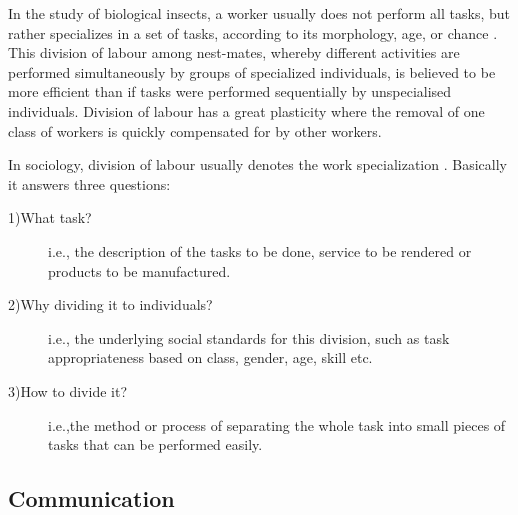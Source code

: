 In the study of biological insects, a worker usually does not perform all tasks, but rather specializes in a set of tasks, according to its morphology, age, or chance \cite{Bonabeau+1999}. This division of labour among nest-mates, whereby different activities are performed simultaneously by groups of specialized individuals, is believed to be more efficient than if tasks were performed sequentially by unspecialised individuals. Division of  labour has a great plasticity where the removal of one class of workers is quickly compensated for by other workers.

In sociology, division of labour usually denotes the work specialization \cite{Sayer+1992}. Basically it answers three questions:
\begin{description}
\item[1)What task?] i.e., the description of the tasks to be done, service to be rendered or products to be manufactured.
\item[2)Why dividing it to individuals?] i.e., the underlying social standards for this division, such as task appropriateness based on class, gender, age, skill etc.
\item[3)How to divide it?] i.e.,the method or process of separating the whole task into small pieces of tasks that can be performed easily. 
\end{description}
\subsection{Communication} 
